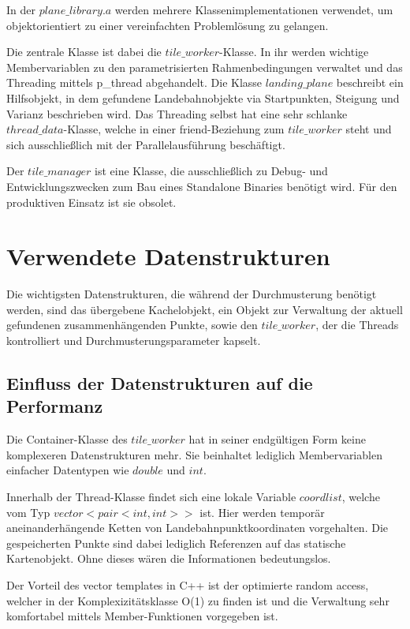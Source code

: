 \documentclass[10pt,a4paper]{report}
\begin{document}
In der $plane\_library.a$ werden mehrere Klassenimplementationen verwendet, um objektorientiert zu einer vereinfachten Problemlösung zu gelangen.

Die zentrale Klasse ist dabei die $tile\_worker$-Klasse. In ihr werden wichtige Membervariablen zu den parametrisierten Rahmenbedingungen verwaltet und das Threading mittels p\_thread abgehandelt. Die Klasse $landing\_plane$ beschreibt ein Hilfsobjekt, in dem gefundene Landebahnobjekte via Startpunkten, Steigung und Varianz beschrieben wird.
Das Threading selbst hat eine sehr schlanke $thread\_data$-Klasse, welche in einer \glqq friend\grqq -Beziehung zum $tile\_worker$ steht und sich ausschließlich mit der Parallelausführung beschäftigt.

Der $tile\_manager$ ist eine Klasse, die ausschließlich zu Debug- und Entwicklungszwecken zum Bau eines Standalone Binaries benötigt wird.
Für den produktiven Einsatz ist sie obsolet.


\section{Verwendete Datenstrukturen}

Die wichtigsten Datenstrukturen, die während der Durchmusterung benötigt werden, sind das übergebene Kachelobjekt, ein Objekt zur Verwaltung der aktuell gefundenen zusammenhängenden Punkte, sowie den $tile\_worker$, der die Threads kontrolliert und Durchmusterungsparameter kapselt. 

\subsection{Einfluss der Datenstrukturen auf die Performanz}

Die Container-Klasse des $tile\_worker$ hat in seiner endgültigen Form keine komplexeren Datenstrukturen mehr. Sie beinhaltet lediglich Membervariablen einfacher Datentypen wie $double$ und $int$.

Innerhalb der Thread-Klasse findet sich eine lokale Variable $coordlist$, welche vom Typ $vector< pair<int,int> >$ ist.
Hier werden temporär aneinanderhängende Ketten von Landebahnpunktkoordinaten vorgehalten. Die gespeicherten Punkte sind dabei lediglich Referenzen auf das statische Kartenobjekt. Ohne dieses wären die Informationen bedeutungslos.

Der Vorteil des vector templates in C++ ist der optimierte random access, welcher in der Komplexizitätsklasse O(1) zu finden ist und die Verwaltung sehr komfortabel mittels Member-Funktionen vorgegeben ist.
\end{document}

